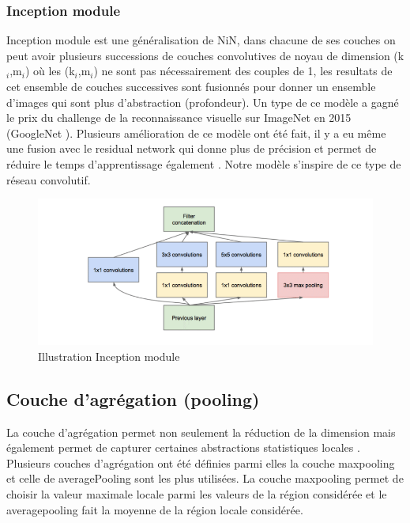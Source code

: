 \subsubsection{Inception module}\cite{im1, im2, im3, im4}
Inception module est une généralisation de NiN, dans chacune de ses couches on peut avoir plusieurs successions de couches convolutives de noyau de dimension (k$_i$,m$_i$) où les (k$_i$,m$_i$) ne sont pas nécessairement des couples de 1, les resultats de cet ensemble de couches successives sont fusionnés pour donner un ensemble d'images qui sont plus d'abstraction (profondeur). Un type de ce modèle a gagné le prix du challenge de la reconnaissance visuelle sur ImageNet en 2015 (GoogleNet \cite{im1}). Plusieurs amélioration de ce modèle ont été fait, il y a eu même une fusion avec le residual network qui donne plus de précision et permet de réduire le temps d'apprentissage également \cite{im1, im2, im3, im4}. Notre modèle s'inspire de ce type de réseau convolutif. 

\begin{figure}[H]
    \centering
    \includegraphics[scale = 0.5]{images/im.png}
    \caption{Illustration Inception module}
\end{figure}

\subsection{Couche d'agrégation (pooling)}
La couche d'agrégation permet non seulement la réduction de la dimension mais également permet de capturer certaines abstractions statistiques locales \cite{pool1, pool2, pool3, pool4}. Plusieurs couches d'agrégation ont été définies parmi elles la couche maxpooling et celle de averagePooling sont les plus utilisées. La couche maxpooling permet de choisir la valeur maximale locale parmi les valeurs de la région considérée et le averagepooling fait la moyenne de la région locale considérée.

